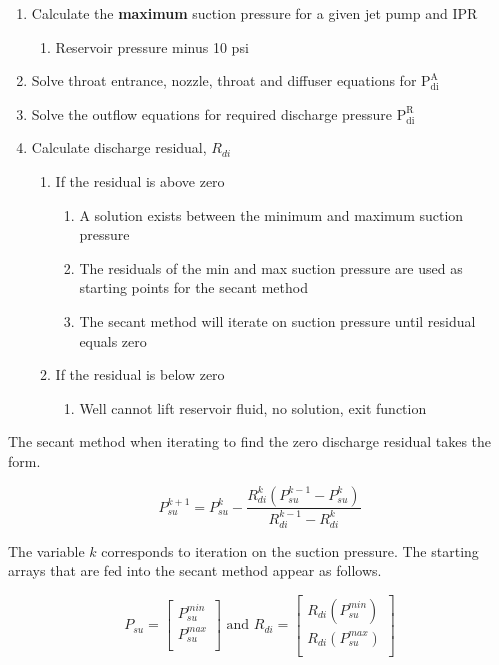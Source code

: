 \documentclass[12 pt]{report}
\newcommand{\pdiA}{$\mathrm{P_{di}^{A}}$\xspace}  %
\newcommand{\pdiR}{$\mathrm{P_{di}^{R}}$\xspace}  %
\begin{document}
\begin{enumerate}
    \item Calculate the \textbf{maximum} suction pressure for a given jet pump and IPR
    \begin{enumerate}
        \item Reservoir pressure minus 10 psi
    \end{enumerate}
    \item Solve throat entrance, nozzle, throat and diffuser equations for \pdiA
    \item Solve the outflow equations for required discharge pressure \pdiR
    \item Calculate discharge residual, $R_{di}$
    \begin{enumerate}
        \item If the residual is above zero
        \begin{enumerate}
            \item A solution exists between the minimum and maximum suction pressure
            \item The residuals of the min and max suction pressure are used as starting points for the secant method
            \item The secant method will iterate on suction pressure until residual equals zero
        \end{enumerate}
        \item If the residual is below zero
        \begin{enumerate}
            \item Well cannot lift reservoir fluid, no solution, exit function
        \end{enumerate}
    \end{enumerate}
\end{enumerate}

The secant method when iterating to find the zero discharge residual takes the form.

\begin{equation*}
    P_{su}^{k+1} = P_{su}^{k} - \frac{R_{di}^{k}(P_{su}^{k-1} - P_{su}^{k})}{R_{di}^{k-1}-R_{di}^{k}} 
\end{equation*}

The variable $k$ corresponds to iteration on the suction pressure. The starting arrays that are fed into the secant method appear as follows.

\begin{equation*}
    P_{su} = 
    \left[
    \begin{array}{c}
    P_{su}^{min} \\[6pt] 	
    P_{su}^{max} \\
    \end{array} 
    \right]
    \text{ and }
    R_{di} = 
    \left[
    \begin{array}{c}
    R_{di}(P_{su}^{min}) \\[6pt] 	
    R_{di}(P_{su}^{max}) \\
    \end{array} 
    \right]
\end{equation*}
\end{document}
